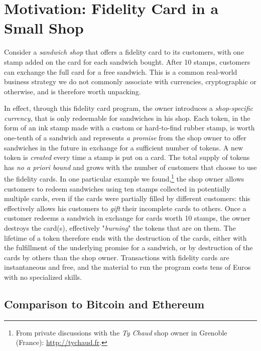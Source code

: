 \documentclass[sigplan,screen,10pt]{acmart}
\begin{document}
\section{Motivation: Fidelity Card in a Small Shop}
\label{section:motivation}

Consider a \textit{sandwich shop} that offers a fidelity card to its customers, with one stamp added on the card for each sandwich bought. After 10 stamps, customers can exchange the full card for a free sandwich. This is a common real-world business strategy we do not commonly associate with currencies, cryptographic or otherwise, and is therefore worth unpacking.

In effect, through this fidelity card program, the owner introduces a \textit{shop-specific currency}, that is only redeemable for sandwiches in his shop. Each token, in the form of an ink stamp made with a custom or hard-to-find rubber stamp,  is worth one-tenth of a sandwich and represents \textit{a promise} from the shop owner to offer sandwiches in the future in exchange for a sufficient number of tokens. A new token is \textit{created} every time a stamp is put on a card. The total supply of tokens has \textit{no a priori bound} and grows with the number of customers that choose to use the fidelity cards. In one particular example we found,\footnote{From private discussions with the \textit{Ty Chaud} shop owner in Grenoble (France): \url{http://tychaud.fr}.} the shop owner allows customers to redeem sandwiches using ten stamps collected in potentially multiple cards, even if the cards were partially filled by different customers: this effectively allows his customers to \textit{gift} their incomplete cards to others. Once a customer redeems a sandwich in exchange for cards worth 10 stamps, the owner destroys the card(s), effectively "\textit{burning}" the tokens that are on them. The lifetime of a token therefore ends with the destruction of the cards, either with the fulfillment of the underlying promise for a sandwich, or by destruction of the cards by others than the shop owner. Transactions with fidelity cards are instantaneous and free, and the material to run the program costs tens of Euros with no specialized skills.

\subsection{Comparison to Bitcoin and Ethereum}
\end{document}

